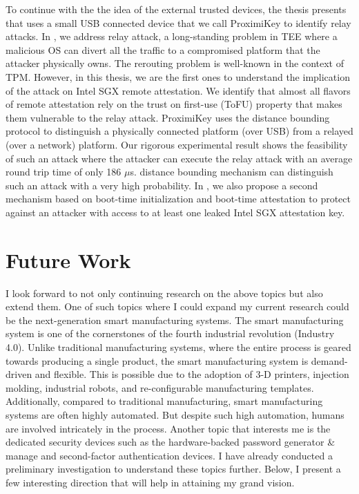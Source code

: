 To continue with the the idea of the external trusted devices, the thesis presents \proximitee that uses a small USB connected device that we call ProximiKey to identify relay attacks. In \proximitee, we address relay attack, a long-standing problem in TEE where a malicious OS can divert all the traffic to a compromised platform that the attacker physically owns. The rerouting problem is well-known in the context of TPM. However, in this thesis, we are the first ones to understand the implication of the attack on Intel SGX remote attestation. We identify that almost all flavors of remote attestation rely on the trust on first-use (ToFU) property that makes them vulnerable to the relay attack. ProximiKey uses the distance bounding protocol to distinguish a physically connected platform (over USB) from a relayed (over a network) platform. Our rigorous experimental result shows the feasibility of such an attack where the attacker can execute the relay attack with an average round trip time of only 186 $\mu$s. \proximitee distance bounding mechanism can distinguish such an attack with a very high probability. In \proximitee, we also propose a second mechanism based on boot-time initialization and boot-time attestation to protect against an attacker with access to at least one leaked Intel SGX attestation key.  


\section{Future Work}

I look forward to not only continuing research on the above topics but also extend them. One of such topics where I could expand my current research could be the next-generation smart manufacturing systems. The smart manufacturing system is one of the cornerstones of the fourth industrial revolution (Industry 4.0). Unlike traditional manufacturing systems, where the entire process is geared towards producing a single product, the smart manufacturing system is demand-driven and flexible. This is possible due to the adoption of 3-D printers, injection molding, industrial robots, and re-configurable manufacturing templates. Additionally, compared to traditional manufacturing, smart manufacturing systems are often highly automated. But despite such high automation, humans are involved intricately in the process. Another topic that interests me is the dedicated security devices such as the hardware-backed password generator \& manage and second-factor authentication devices. I have already conducted a preliminary investigation to understand these topics further. Below, I present a few interesting direction that will help in attaining my grand vision.

